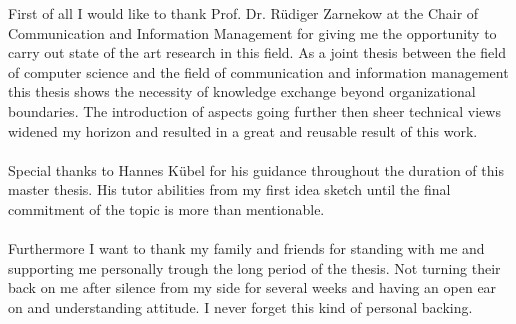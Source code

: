 \thispagestyle{empty}
\vspace*{3cm}

\vspace*{1cm}
\noindent 
First of all I would like to thank Prof. Dr. Rüdiger Zarnekow at the Chair of Communication and Information Management for giving me the opportunity to carry out state of the art research in this field. As a joint thesis between the field of computer science and the field of communication and information management this thesis shows the necessity of knowledge exchange beyond organizational boundaries. The introduction of aspects going further then sheer technical views widened my horizon and resulted in a great and reusable result of this work. 
\\
\\
Special thanks to Hannes Kübel for his guidance throughout the duration of this master thesis. His tutor abilities from my first idea sketch until the final commitment of the topic is more than mentionable.
\\
\\
Furthermore I want to thank my family and friends for standing with me and supporting me personally trough the long period of the thesis. Not turning their back on me after silence from my side for several weeks and having an open ear on and understanding attitude. I never forget this kind of personal backing.